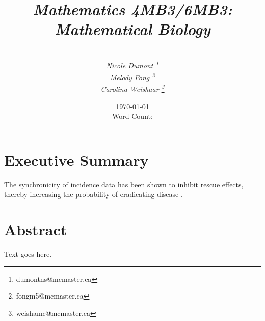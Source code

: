 \documentclass[twocolumn,nofootinbib,showkeys,twoside,floatfix,unsortedaddress,flushbottom,10pt,aps,pra]{report}
\author{\sc{\bfseries Model Students:}\\
\small \emph{Nicole Dumont \footnote{dumontns@mcmaster.ca}} \\
 \small \emph{Melody Fong \footnote{fongm5@mcmaster.ca}} \\
 \small  \emph{Carolina Weishaar \footnote{weishamc@mcmaster.ca}}}
\title{ \small \emph{Mathematics 4MB3/6MB3: Mathematical Biology }\\
  \Huge \sc{\bfseries Spatial Epidemics Dynamics:\\ Synchronization}}
\date{\today \\
  Word Count: }
\begin{document}
\pagestyle{fancy}

\maketitle
\tableofcontents

\onecolumn
\section*{\Huge Executive Summary}
%

The synchronicity of incidence data has been shown to inhibit rescue effects, thereby increasing the probability of eradicating disease \cite{McCluskley2014}. 



\twocolumn

\section{Abstract} Text goes here.
\end{document}
